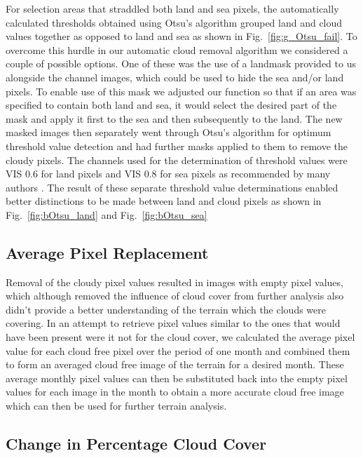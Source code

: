 For selection areas that straddled both land and sea pixels, the automatically calculated thresholds obtained using Otsu's algorithm grouped land and cloud values together as opposed to land and sea as shown in Fig.~\ref{fig:g_Otsu_fail}. %
To overcome this hurdle in our automatic cloud removal algorithm we considered a couple of possible options. One of these was the use of a landmask provided to us alongside the channel images, which could be used to hide the sea and/or land pixels. To enable use of this mask we adjusted our function so that if an area was specified to contain both land and sea, it would select the desired part of the mask and apply it first to the sea and then subsequently to the land. The new masked images then separately went through Otsu's algorithm for optimum threshold value detection and had further masks applied to them to remove the cloudy pixels. The channels used for the determination of threshold values were VIS 0.6 for land pixels and VIS 0.8 for sea pixels as recommended by many authors \cite{}. 
The result of these separate threshold value determinations enabled better distinctions to be made between land and cloud pixels as shown in Fig.~\ref{fig:bOtsu_land} and Fig.~\ref{fig:bOtsu_sea}

\subsection{Average Pixel Replacement}

Removal of the cloudy pixel values resulted in images with empty pixel values, which although removed the influence of cloud cover from further analysis also didn't provide a better understanding of the terrain which the clouds were covering. In an attempt to retrieve pixel values similar to the ones that would have been present were it not for the cloud cover, we calculated the average pixel value for each cloud free pixel over the period of one month and combined them to form an averaged cloud free image of the terrain for a desired month. These average monthly pixel values can then be substituted back into the empty pixel values for each image in the month to obtain a more accurate cloud free image which can then be used for further terrain analysis.

\subsection{Change in Percentage Cloud Cover}

